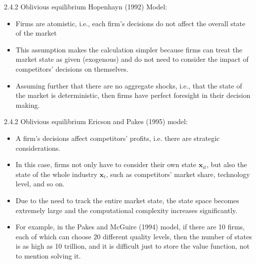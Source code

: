 \documentclass[aspectratio=169]{beamer}  %
\begin{document}
\begin{frame}{2.4.2 Oblivious equilibrium}
Hopenhayn (1992) Model:
\begin{itemize}
    \item Firms are atomistic, i.e., each firm's decisions do not affect the overall state of the market 
    \item This assumption makes the calculation simpler because firms can treat the market state as given (exogenous) and do not need to consider the impact of competitors' decisions on themselves.

    \item Assuming further that there are no aggregate shocks, i.e., that the state of the market is deterministic, then firms have perfect foresight in their decision making.
\end{itemize}

 
\end{frame}

\begin{frame}
{2.4.2 Oblivious equilibrium}
Ericson and Pakes (1995) model:
\begin{itemize}

    \item A firm's decisions affect competitors' profits, i.e. there are strategic considerations. 
    \item In this case, firms not only have to consider their own state $\mathbf{x}_{it}$, but also the state of the whole industry $\mathbf{x}_t$, such as competitors' market share, technology level, and so on.
    \item Due to the need to track the entire market state, the state space becomes extremely large and the computational complexity increases significantly.
    \item For example, in the Pakes and McGuire (1994) model, if there are 10 firms, each of which can choose 20 different quality levels, then the number of states is as high as 10 trillion, and it is difficult just to store the value function, not to mention solving it.
\end{itemize}
\end{frame}
\end{document}
